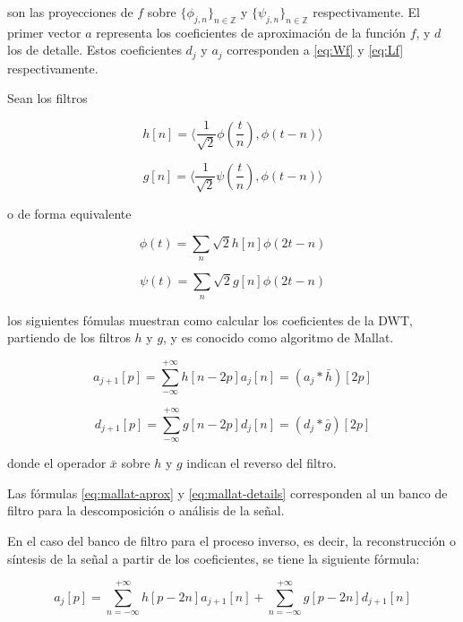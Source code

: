 \noindent son las proyecciones de $f$ sobre $\{\phi_{j,n}\}_{n\in \mathbb{Z}}$ y $\{\psi_{j,n}\}_{n\in \mathbb{Z}}$ 
respectivamente. El primer vector $a$ representa los coeficientes de aproximación de la función $f$,
y $d$ los de detalle. Estos coeficientes $d_j$ y $a_j$ corresponden a \ref{eq:Wf} y \ref{eq:Lf} 
respectivamente. 

Sean los filtros 

\begin{equation}
	h[n] = \langle \frac{1}{\sqrt{2}} \phi(\frac{t}{n}), \phi(t-n) \rangle
\end{equation}

\begin{equation}
	g[n] = \langle \frac{1}{\sqrt{2}} \psi(\frac{t}{n}), \phi(t-n) \rangle
\end{equation}

\noindent o de forma equivalente

\begin{equation}
	\phi(t) = \sum_n \sqrt{2}h[n]\phi(2t-n)
\end{equation}

\begin{equation}
	\psi(t) = \sum_n \sqrt{2}g[n]\phi(2t-n)
\end{equation}

los siguientes fómulas muestran como calcular los coeficientes de la DWT, partiendo de los filtros 
$h$ y $g$, y es conocido como algoritmo de Mallat. 

\begin{equation}\label{eq:mallat-aprox}
	a_{j+1}[p] = \sum_{-\infty}^{+\infty} h[n-2p]a_j[n] = (a_j * \bar h)[2p]
\end{equation}

\begin{equation}\label{eq:mallat-details}
	d_{j+1}[p] = \sum_{-\infty}^{+\infty} g[n-2p]d_j[n] = (d_j * \bar g)[2p]
\end{equation}

\noindent donde el operador $\bar x$ sobre $h$ y $g$ indican el reverso del filtro.

Las fórmulas \ref{eq:mallat-aprox} y \ref{eq:mallat-details} corresponden al un banco de filtro para la
descomposición o análisis de la señal. 

En el caso del banco de filtro para el proceso inverso, es decir, la reconstrucción o síntesis de la señal a 
partir de los coeficientes, se tiene la siguiente fórmula:

\begin{equation}
	a_j[p] = \sum_{n= -\infty}^{+\infty} h[p-2n]a_{j+1}[n] + \sum_{n= -\infty}^{+\infty}g[p-2n]d_{j+1}[n] 
\end{equation}

